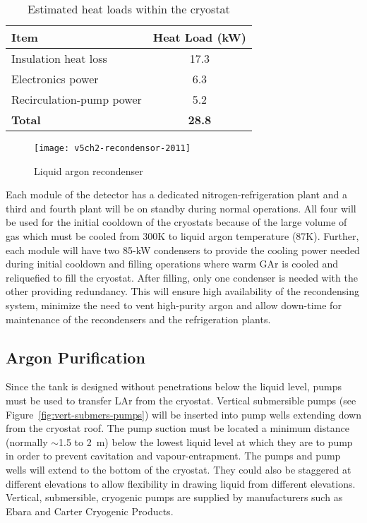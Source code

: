 \begin{table}
\centering
\caption{Estimated heat loads within the cryostat}
\label{table:cryo-heat-loads}
\begin{tabular}[htbp]{|l|c|}
\hline
\textbf{Item} & \textbf{Heat Load (kW)}\\
\hline
Insulation heat loss & 17.3  \\
\hline
Electronics power & 6.3  \\
\hline
Recirculation-pump power & 5.2  \\
\hline
\textbf{Total} & \textbf{28.8} \\
\hline
\end{tabular} 
\end{table}


\begin{figure}[htbp]
\centering
\texttt{[image: v5ch2-recondensor-2011]}
\caption{Liquid argon recondenser}
\label{fig:v5ch2-recondenser-sept-2011}
\end{figure}

Each module of the detector has a dedicated nitrogen-refrigeration plant 
 and a third and fourth plant will be on standby during normal operations. All four will be used
for the initial cooldown of the cryostats
because of the large volume of gas which must be cooled from 300K to liquid
argon temperature (87K). Further, each module will
have two 85-kW condensers to provide the
cooling power needed during initial cooldown and filling operations where warm GAr
is cooled and reliquefied to fill the cryostat.
After filling, only one condenser is needed with the
other providing redundancy.
This will ensure high availability of the recondensing system, minimize the need to vent high-purity argon and allow down-time for maintenance of
the recondensers and the refrigeration plants. 

\subsection{Argon Purification}
\label{subsec:argon-pur}
Since the tank is designed without penetrations below the liquid level, pumps must be used to transfer LAr from the cryostat.  Vertical submersible 
pumps (see Figure~\ref{fig:vert-submers-pumps}) will be inserted into pump wells extending down from the cryostat roof.  The pump suction 
must be located a minimum distance (normally $\sim$1.5 to 2~m) below 
the lowest liquid level at which they are to pump in order to prevent cavitation and vapour-entrapment. 
The pumps and pump wells will extend to the bottom of the cryostat.  They 
could also be staggered at different elevations to allow flexibility in drawing liquid from different 
elevations. Vertical, submersible, cryogenic pumps are supplied by manufacturers such as Ebara and 
Carter Cryogenic Products.



